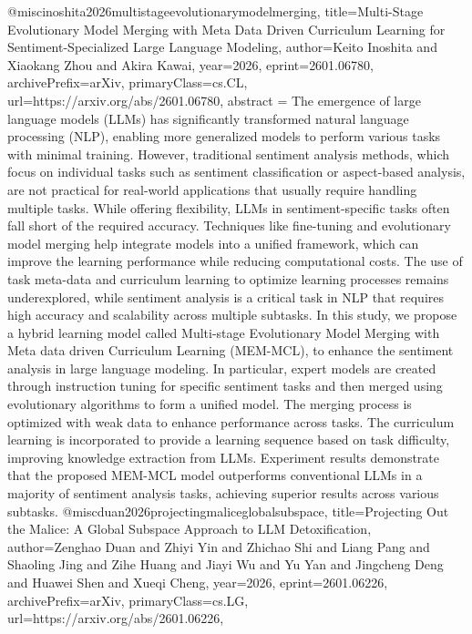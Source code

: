 {}@misc{inoshita2026multistageevolutionarymodelmerging,
      title={Multi-Stage Evolutionary Model Merging with Meta Data Driven Curriculum Learning for Sentiment-Specialized Large Language Modeling}, 
      author={Keito Inoshita and Xiaokang Zhou and Akira Kawai},
      year={2026},
      eprint={2601.06780},
      archivePrefix={arXiv},
      primaryClass={cs.CL},
      url={https://arxiv.org/abs/2601.06780},
      abstract = {The emergence of large language models (LLMs) has significantly transformed natural language processing (NLP), enabling more generalized models to perform various tasks with minimal training. However, traditional sentiment analysis methods, which focus on individual tasks such as sentiment classification or aspect-based analysis, are not practical for real-world applications that usually require handling multiple tasks. While offering flexibility, LLMs in sentiment-specific tasks often fall short of the required accuracy. Techniques like fine-tuning and evolutionary model merging help integrate models into a unified framework, which can improve the learning performance while reducing computational costs. The use of task meta-data and curriculum learning to optimize learning processes remains underexplored, while sentiment analysis is a critical task in NLP that requires high accuracy and scalability across multiple subtasks. In this study, we propose a hybrid learning model called Multi-stage Evolutionary Model Merging with Meta data driven Curriculum Learning (MEM-MCL), to enhance the sentiment analysis in large language modeling. In particular, expert models are created through instruction tuning for specific sentiment tasks and then merged using evolutionary algorithms to form a unified model. The merging process is optimized with weak data to enhance performance across tasks. The curriculum learning is incorporated to provide a learning sequence based on task difficulty, improving knowledge extraction from LLMs. Experiment results demonstrate that the proposed MEM-MCL model outperforms conventional LLMs in a majority of sentiment analysis tasks, achieving superior results across various subtasks.}
}@misc{duan2026projectingmaliceglobalsubspace,
      title={Projecting Out the Malice: A Global Subspace Approach to LLM Detoxification}, 
      author={Zenghao Duan and Zhiyi Yin and Zhichao Shi and Liang Pang and Shaoling Jing and Zihe Huang and Jiayi Wu and Yu Yan and Jingcheng Deng and Huawei Shen and Xueqi Cheng},
      year={2026},
      eprint={2601.06226},
      archivePrefix={arXiv},
      primaryClass={cs.LG},
      url={https://arxiv.org/abs/2601.06226},
}
